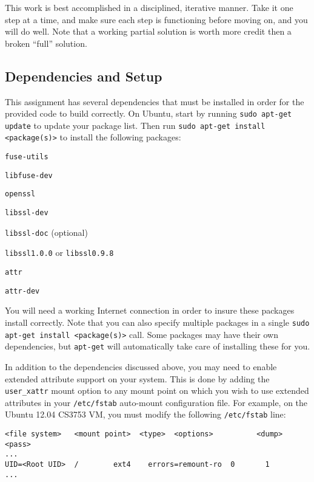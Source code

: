 \documentclass[12pt]{article}
\newenvironment{packed_item}{
\begin{itemize}
  \setlength{\itemsep}{1pt}
  \setlength{\parskip}{0pt}
  \setlength{\parsep}{0pt}
}{\end{itemize}}
\begin{document}
This work is best accomplished in a disciplined, iterative manner. Take
it one step at a time, and make sure each step is functioning before
moving on, and you will do well. Note that a working partial solution
is worth more credit then a broken ``full'' solution.

\subsection{Dependencies and Setup}
This assignment has several dependencies that must be installed in order
for the provided code to build correctly. On Ubuntu, start
by running \texttt{sudo apt-get update} to update your package
list. Then run \texttt{sudo apt-get install <package(s)>} to install the
following packages:

\begin{packed_item}
\item \texttt{fuse-utils}
\item \texttt{libfuse-dev}
\item \texttt{openssl}
\item \texttt{libssl-dev}
\item \texttt{libssl-doc} (optional)
\item \texttt{libssl1.0.0} or \texttt{libssl0.9.8}
\item \texttt{attr}
\item \texttt{attr-dev}
\end{packed_item}

You will need a working Internet connection in order to insure these
packages install correctly. Note that you can also specify multiple
packages in a single \texttt{sudo apt-get install <package(s)>}
call. Some packages may have their own dependencies, but
\texttt{apt-get} will automatically take care of installing these for you.

In addition to the dependencies discussed above, you may need to
enable extended attribute support on your system. This is done by
adding the \texttt{user\_xattr} mount option to any mount point on
which you wish to use extended attributes in your \texttt{/etc/fstab}
auto-mount configuration file. For example, on the Ubuntu 12.04 CS3753
VM, you must modify the following \texttt{/etc/fstab} line:

\begin{verbatim}
<file system>   <mount point>  <type>  <options>          <dump>  <pass> 
...
UID=<Root UID>  /        ext4    errors=remount-ro  0       1
...
\end{verbatim}
\end{document}
